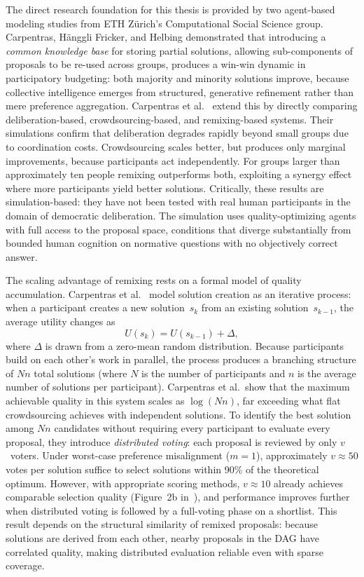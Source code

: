 \documentclass[a4paper, 12pt, twoside]{iviathesis}
\begin{document}
The direct research foundation for this thesis is provided by two agent-based modeling studies from ETH Z\"{u}rich's Computational Social Science group. Carpentras, H\"{a}nggli Fricker, and Helbing \cite{carpentras_empowering_2024} demonstrated that introducing a \textit{common knowledge base} for storing partial solutions, allowing sub-components of proposals to be re-used across groups, produces a win-win dynamic in participatory budgeting: both majority and minority solutions improve, because collective intelligence emerges from structured, generative refinement rather than mere preference aggregation. Carpentras et al.\ \cite{carpentras_wisdom_2025} extend this by directly comparing deliberation-based, crowdsourcing-based, and remixing-based systems. Their simulations confirm that deliberation degrades rapidly beyond small groups due to coordination costs. Crowdsourcing scales better, but produces only marginal improvements, because participants act independently. For groups larger than approximately ten people remixing outperforms both, exploiting a synergy effect where more participants yield better solutions. Critically, these results are simulation-based: they have not been tested with real human participants in the domain of democratic deliberation. The simulation uses quality-optimizing agents with full access to the proposal space, conditions that diverge substantially from bounded human cognition on normative questions with no objectively correct answer.

The scaling advantage of remixing rests on a formal model of quality accumulation. Carpentras et al.~\cite{carpentras_wisdom_2025} model solution creation as an iterative process: when a participant creates a new solution~$s_k$ from an existing solution~$s_{k-1}$, the average utility changes as
\begin{equation}
  U(s_k) = U(s_{k-1}) + \Delta, \label{eq:quality-step}
\end{equation}
where $\Delta$ is drawn from a zero-mean random distribution. Because participants build on each other's work in parallel, the process produces a branching structure of $Nn$ total solutions (where $N$ is the number of participants and $n$ is the average number of solutions per participant). Carpentras et al.\ show that the maximum achievable quality in this system scales as $\log(Nn)$, far exceeding what flat crowdsourcing achieves with independent solutions. To identify the best solution among $Nn$ candidates without requiring every participant to evaluate every proposal, they introduce \textit{distributed voting}: each proposal is reviewed by only $v$~voters. Under worst-case preference misalignment ($m = 1$), approximately $v \approx 50$ votes per solution suffice to select solutions within 90\% of the theoretical optimum. However, with appropriate scoring methods, $v \approx 10$ already achieves comparable selection quality (Figure~2b in~\cite{carpentras_wisdom_2025}), and performance improves further when distributed voting is followed by a full-voting phase on a shortlist. This result depends on the structural similarity of remixed proposals: because solutions are derived from each other, nearby proposals in the DAG have correlated quality, making distributed evaluation reliable even with sparse coverage.
\end{document}

